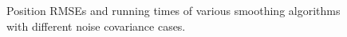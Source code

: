 \documentclass[10pt,twocolumn,twoside]{IEEEtran}
\begin{document}
\begin{figure}[!t]
\centering
{}
\\
\\
\caption{Position RMSEs and running times of various smoothing algorithms with different noise covariance cases.}%
\label{fig:rmse_vs_time}%
\end{figure}
\end{document}
